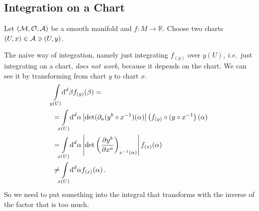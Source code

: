 \documentclass[11pt, a4paper, twocolumn]{article} %
\begin{document}
    \subsection{Integration on a Chart}
    Let $(\mathcal{M}, \mathcal{O}, \mathcal{A})$ be a smooth manifold and $f: M\to\mathbb{R}$.
    Choose two charts $(U,x)\in \mathcal{A} \ni (U,y)$.
    \begin{center}
    \end{center}
    The naive way of integration, namely just integrating $f_{(y)}$ over $y(U)$, \textit{i.e.}\
    just integrating on a chart, \textit{does not work}, because it depends on the chart.
    We can see it by transforming from chart $y$ to chart $x$.
    \begin{align}
        \nonumber&\int\limits_{\mathclap{y(U)}} \difff^d\! \beta f_{(y)} (\beta)= \\
        \nonumber&=\int\limits_{\mathclap{x(U)}} \difff^d\! \alpha \left| \det(\partial_a (y^b\circ x^{-1})(\alpha) \right| \left( f_{(y)} \circ (y\circ x^{-1} \right)(\alpha)\\
        \nonumber&=\int\limits_{\mathclap{x(U)}} \difff^d\! \alpha \left| \det\left( \frac{\partial y^b}{\partial x^a} \right)_{x^{-1}(\alpha)} \right| f_{(x)}(\alpha)\\
        &\neq \int\limits_{\mathclap{x(U)}} \difff^d\! \alpha f_{(x)} (\alpha)\,.
        \label{eq:naiveIntegral}
    \end{align}
    So we need to put something into the integral that transforms with the inverse of the factor that is too much.
    
\end{document}
